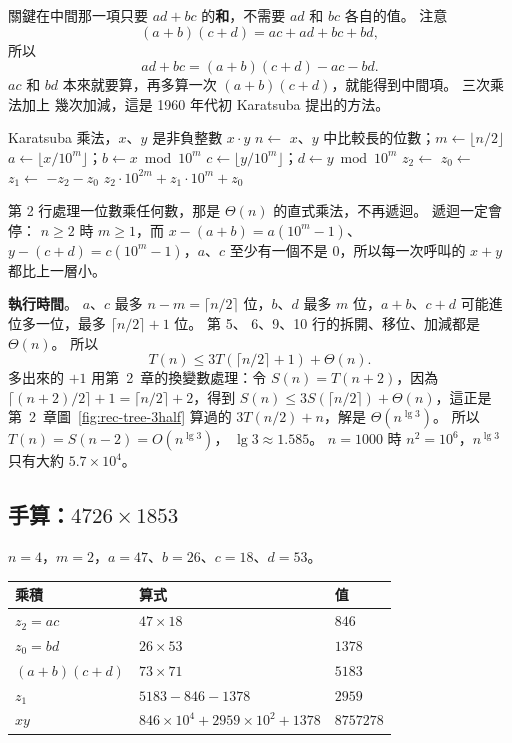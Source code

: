 關鍵在中間那一項只要 $ad + bc$ 的\textbf{和}，不需要 $ad$ 和 $bc$ 各自的值。 注意
\[
(a + b)(c + d) = ac + ad + bc + bd,
\]
所以
\[
ad + bc = (a + b)(c + d) - ac - bd .
\]
$ac$ 和 $bd$ 本來就要算，再多算一次 $(a+b)(c+d)$，就能得到中間項。 三次乘法加上
幾次加減，這是 1960 年代初 Karatsuba 提出的方法。

\begin{pseudo}[label=alg:dc-karatsuba]{Karatsuba 乘法，$x$、$y$ 是非負整數}
        \State \Return $x \cdot y$ 
    \EndIf
    \State $n \gets$ $x$、$y$ 中比較長的位數；$m \gets \lfloor n/2 \rfloor$
    \State $a \gets \lfloor x / 10^m \rfloor$；$b \gets x \bmod 10^m$
    \State $c \gets \lfloor y / 10^m \rfloor$；$d \gets y \bmod 10^m$
    \State $z_2 \gets$ 
    \State $z_0 \gets$ 
    \State $z_1 \gets$  $- z_2 - z_0$
    \State \Return $z_2 \cdot 10^{2m} + z_1 \cdot 10^m + z_0$
\EndFunction
\end{pseudo}

第 2 行處理一位數乘任何數，那是 $\Theta(n)$ 的直式乘法，不再遞迴。 遞迴一定會停：
$n \ge 2$ 時 $m \ge 1$，而 $x - (a + b) = a(10^m - 1)$、$y - (c + d) = c(10^m -
1)$，$a$、$c$ 至少有一個不是 $0$，所以每一次呼叫的 $x + y$ 都比上一層小。

\textbf{執行時間}。 $a$、$c$ 最多 $n - m = \lceil n/2 \rceil$ 位，$b$、$d$ 最多
$m$ 位，$a + b$、$c + d$ 可能進位多一位，最多 $\lceil n/2 \rceil + 1$ 位。 第 5、
6、9、10 行的拆開、移位、加減都是 $\Theta(n)$。 所以
\[
T(n) \le 3T(\lceil n/2 \rceil + 1) + \Theta(n).
\]
多出來的 $+1$ 用第~2~章的換變數處理：令 $S(n) = T(n + 2)$，因為
$\lceil (n+2)/2 \rceil + 1 = \lceil n/2 \rceil + 2$，得到
$S(n) \le 3S(\lceil n/2 \rceil) + \Theta(n)$，這正是第~2~章圖~\ref{fig:rec-tree-3half} 算過的
$3T(n/2) + n$，解是 $\Theta(n^{\lg 3})$。 所以 $T(n) = S(n-2) = O(n^{\lg 3})$，
$\lg 3 \approx 1.585$。 $n = 1000$ 時 $n^2 = 10^6$，$n^{\lg 3}$ 只有大約
$5.7 \times 10^4$。

\subsection{手算：\texorpdfstring{$4726 \times 1853$}{4726 × 1853}}

$n = 4$，$m = 2$，$a = 47$、$b = 26$、$c = 18$、$d = 53$。

\begin{center}
\begin{tabular}{lll}
\toprule
乘積 & 算式 & 值 \\
\midrule
$z_2 = ac$ & $47 \times 18$ & $846$ \\
$z_0 = bd$ & $26 \times 53$ & $1378$ \\
$(a + b)(c + d)$ & $73 \times 71$ & $5183$ \\
$z_1$ & $5183 - 846 - 1378$ & $2959$ \\
\midrule
$xy$ & $846 \times 10^4 + 2959 \times 10^2 + 1378$ & $8757278$ \\
\bottomrule
\end{tabular}
\end{center}

